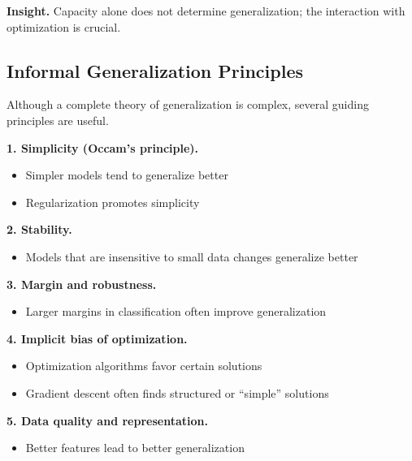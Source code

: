 \medskip

\noindent
\textbf{Insight.}  
Capacity alone does not determine generalization; the interaction with optimization is crucial.

\subsection{Informal Generalization Principles}

Although a complete theory of generalization is complex, several guiding principles are useful.

\medskip

\noindent
\textbf{1. Simplicity (Occam's principle).}
\begin{itemize}
    \item Simpler models tend to generalize better
    \item Regularization promotes simplicity
\end{itemize}

\medskip

\noindent
\textbf{2. Stability.}
\begin{itemize}
    \item Models that are insensitive to small data changes generalize better
\end{itemize}

\medskip

\noindent
\textbf{3. Margin and robustness.}
\begin{itemize}
    \item Larger margins in classification often improve generalization
\end{itemize}

\medskip

\noindent
\textbf{4. Implicit bias of optimization.}
\begin{itemize}
    \item Optimization algorithms favor certain solutions
    \item Gradient descent often finds structured or “simple” solutions
\end{itemize}

\medskip

\noindent
\textbf{5. Data quality and representation.}
\begin{itemize}
    \item Better features lead to better generalization
\end{itemize}

\medskip

